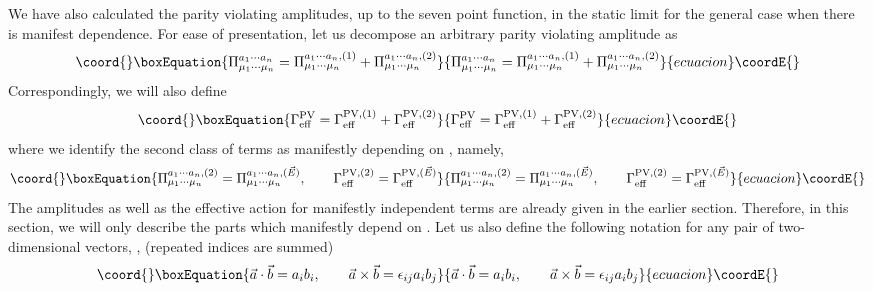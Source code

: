 \documentclass[a4paper,12pt]{article}
\begin{document}
We have also calculated the parity violating amplitudes, up to the
seven point function, in the static limit for the general case when
there is manifest
\coordHE{} dependence. For ease of presentation, let us decompose an
arbitrary parity violating amplitude as
\begin{equation}\coord{}\boxEquation{
\Pi_{\mu_{1}\cdots \mu_{n}}^{a_{1}\cdots a_{n}} = \Pi_{\mu_{1}\cdots
  \mu_{n}}^{a_{1}\cdots a_{n}, (1)} +
  \Pi_{\mu_{1}\cdots\mu_{n}}^{a_{1}\cdots a_{n},(2)}\label{19}
}{
\Pi_{\mu_{1}\cdots \mu_{n}}^{a_{1}\cdots a_{n}} = \Pi_{\mu_{1}\cdots
  \mu_{n}}^{a_{1}\cdots a_{n}, (1)} +
  \Pi_{\mu_{1}\cdots\mu_{n}}^{a_{1}\cdots a_{n},(2)}}{ecuacion}\coordE{}\end{equation}
Correspondingly, we will also define
\begin{equation}\coord{}\boxEquation{
\Gamma_{\rm eff}^{\rm PV} = \Gamma_{\rm eff}^{{\rm PV}, (1)} +
\Gamma_{\rm eff}^{{\rm PV}, (2)}\label{20}
}{
\Gamma_{\rm eff}^{\rm PV} = \Gamma_{\rm eff}^{{\rm PV}, (1)} +
\Gamma_{\rm eff}^{{\rm PV}, (2)}}{ecuacion}\coordE{}\end{equation}
where we identify the second class of terms as manifestly depending on
\coordHE{}, namely,
\begin{equation}\coord{}\boxEquation{
\Pi_{\mu_{1}\cdots \mu_{n}}^{a_{1}\cdots a_{n}, (2)} =
\Pi_{\mu_{1}\cdots \mu_{n}}^{a_{1}\cdots a_{n}, (\vec{E})},\qquad
\Gamma_{\rm eff}^{{\rm PV}, (2)} = \Gamma_{\rm eff}^{{\rm PV},
(\vec{E})}
}{
\Pi_{\mu_{1}\cdots \mu_{n}}^{a_{1}\cdots a_{n}, (2)} =
\Pi_{\mu_{1}\cdots \mu_{n}}^{a_{1}\cdots a_{n}, (\vec{E})},\qquad
\Gamma_{\rm eff}^{{\rm PV}, (2)} = \Gamma_{\rm eff}^{{\rm PV},
(\vec{E})}
}{ecuacion}\coordE{}\end{equation} 
The amplitudes as well as the effective action for manifestly
\coordHE{} independent  terms are
already given in the earlier section. Therefore, in this section, we
will only describe the parts which manifestly depend on \coordHE{}. Let
us  also define the following notation for any pair of
two-dimensional
vectors, \coordHE{}, (repeated indices are summed)
\begin{equation}\coord{}\boxEquation{
\vec{a}\cdot \vec{b} = a_{i}b_{i},\qquad \vec{a}\times \vec{b} =
\epsilon_{ij}a_{i}b_{j}\label{21}
}{
\vec{a}\cdot \vec{b} = a_{i}b_{i},\qquad \vec{a}\times \vec{b} =
\epsilon_{ij}a_{i}b_{j}}{ecuacion}\coordE{}\end{equation}
\end{document}
